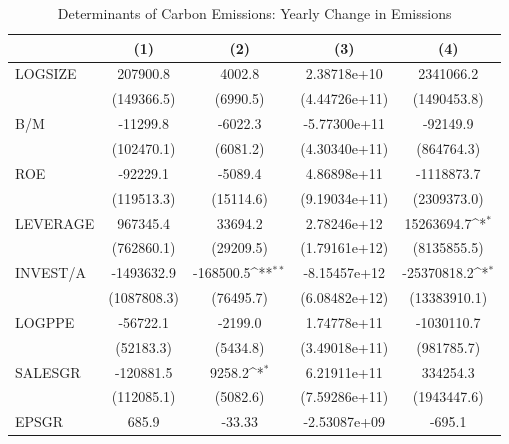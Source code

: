\begin{table}[htbp]\centering
\def\sym#1{\ifmmode^{#1}\else\(^{#1}\)\fi}
\caption{Determinants of Carbon Emissions: Yearly Change in Emissions}
\begin{tabular}{l*{4}{c}}
\hline\hline
                    &\multicolumn{1}{c}{(1)}         &\multicolumn{1}{c}{(2)}         &\multicolumn{1}{c}{(3)}         &\multicolumn{1}{c}{(4)}         \\
\hline
LOGSIZE             &    207900.8         &      4002.8         & 2.38718e+10         &   2341066.2         \\
                    &  (149366.5)         &    (6990.5)         &(4.44726e+11)         & (1490453.8)         \\
B/M                 &    -11299.8         &     -6022.3         &-5.77300e+11         &    -92149.9         \\
                    &  (102470.1)         &    (6081.2)         &(4.30340e+11)         &  (864764.3)         \\
ROE                 &    -92229.1         &     -5089.4         & 4.86898e+11         &  -1118873.7         \\
                    &  (119513.3)         &   (15114.6)         &(9.19034e+11)         & (2309373.0)         \\
LEVERAGE            &    967345.4         &     33694.2         & 2.78246e+12         &  15263694.7\sym{*}  \\
                    &  (762860.1)         &   (29209.5)         &(1.79161e+12)         & (8135855.5)         \\
INVEST/A            &  -1493632.9         &   -168500.5\sym{**} &-8.15457e+12         & -25370818.2\sym{*}  \\
                    & (1087808.3)         &   (76495.7)         &(6.08482e+12)         &(13383910.1)         \\
LOGPPE              &    -56722.1         &     -2199.0         & 1.74778e+11         &  -1030110.7         \\
                    &   (52183.3)         &    (5434.8)         &(3.49018e+11)         &  (981785.7)         \\
SALESGR             &   -120881.5         &      9258.2\sym{*}  & 6.21911e+11         &    334254.3         \\
                    &  (112085.1)         &    (5082.6)         &(7.59286e+11)         & (1943447.6)         \\
EPSGR               &       685.9         &      -33.33         &-2.53087e+09         &      -695.1         \\

\end{tabular}
\end{table}
